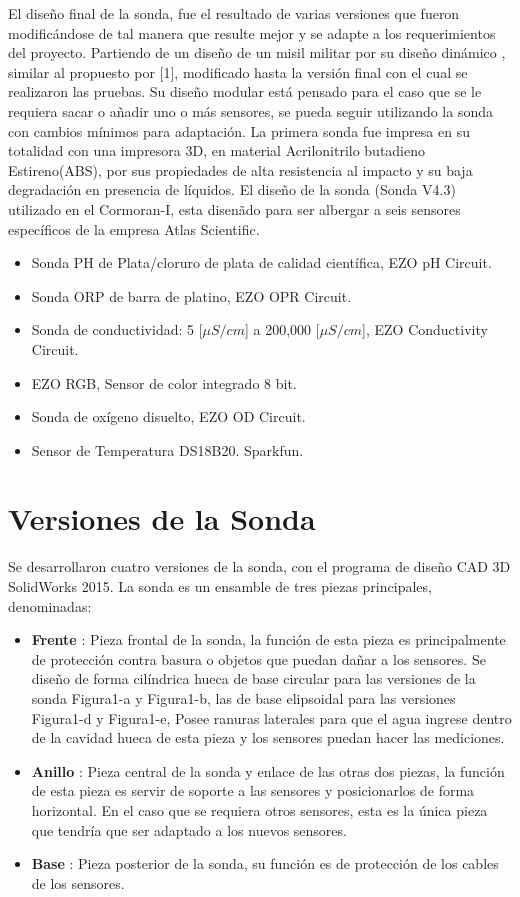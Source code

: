\begin{appendices}
El diseño final de la sonda, fue el resultado de varias versiones que fueron modificándose de tal manera que resulte mejor y se adapte a los requerimientos del proyecto.
Partiendo de un diseño de un misil militar por su dise\~no din\'amico , similar al propuesto por [1], modificado hasta la versión final con el cual se realizaron las pruebas. Su diseño modular est\'a pensado para el caso que se le requiera sacar o añadir uno o m\'as sensores, se pueda seguir utilizando la sonda con cambios mínimos para adaptación.
La primera sonda fue impresa en su totalidad con una impresora 3D, en material Acrilonitrilo butadieno Estireno(ABS), por sus propiedades de alta resistencia al impacto y su baja degradación en presencia de líquidos. 
El diseño de la sonda (Sonda V4.3) utilizado en el Cormoran-I, esta disen\~ado para ser albergar a seis sensores específicos de la empresa Atlas Scientific.

\begin{itemize}
    \item Sonda PH de Plata/cloruro de plata de calidad científica, EZO pH Circuit.
    \item Sonda ORP de barra de platino, EZO OPR Circuit.
    \item Sonda de conductividad: 5 [\(\mu S/cm\)] a 200,000 [\(\mu S/cm\)], EZO Conductivity Circuit.
    \item EZO RGB, Sensor de color integrado 8 bit.
    \item Sonda de oxígeno disuelto, EZO OD Circuit.
    \item Sensor de Temperatura DS18B20. Sparkfun.
\end{itemize}
    
\section*{Versiones de la Sonda }
Se desarrollaron cuatro versiones de la sonda, con el programa de diseño CAD 3D SolidWorks 2015. La sonda es un ensamble de tres piezas principales, denominadas:

\begin{itemize}
\item \textbf{Frente} : Pieza frontal de la sonda, la función de esta pieza es principalmente de protección contra basura o objetos que puedan dañar a los sensores. Se dise\~no de forma cil\'indrica hueca de base circular para las versiones de la sonda Figura1-a y Figura1-b, las de base elipsoidal para las versiones Figura1-d y Figura1-e, Posee ranuras laterales para que el agua ingrese dentro de la cavidad hueca de esta pieza y los sensores puedan hacer las mediciones.  
\item \textbf{Anillo} : Pieza central de la sonda y enlace de las otras dos piezas, la función de esta pieza es servir de soporte a las sensores y posicionarlos de forma horizontal. En el caso que se requiera otros sensores, esta es la única pieza que tendría que ser adaptado a los nuevos sensores.
\item \textbf{Base}  : Pieza posterior de la sonda, su función es de protección de los cables de los sensores. 
\end{itemize}


\end{appendices}
